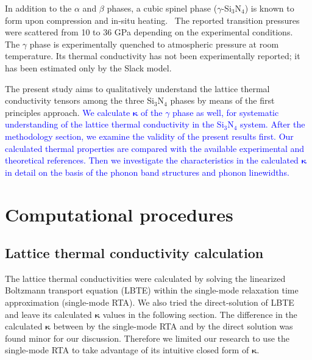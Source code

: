 \documentclass[twocolumn,amsmath,amssymb,a4paper,prb,superscriptaddress,floatfix]{revtex4-1}
\begin{document}
In addition to the $\alpha$ and $\beta$ phases, a cubic spinel phase
($\gamma$-Si$_3$N$_4$) is known to form upon compression and in-situ
heating.~\cite{zerr,zhang} The reported transition pressures were scattered
from 10 to 36 GPa depending on the experimental conditions.~\cite{xu}  The
$\gamma$ phase is experimentally quenched to atmospheric pressure at room
temperature.  Its thermal conductivity has not been experimentally reported; it
has been estimated only by the Slack model.~\cite{morelli} 

The present study aims to qualitatively understand the lattice thermal
conductivity tensors among the three Si$_3$N$_4$ phases by means of the first
principles approach.  \textcolor{blue}{We calculate $\boldsymbol{\kappa}$ of
the $\gamma$ phase as well, for systematic understanding of the lattice
thermal conductivity in the Si$_3$N$_4$ system.  After the methodology
section, we examine the validity of the present results first.  Our
calculated thermal properties are compared with the available experimental
and theoretical references.  Then we investigate the characteristics in the
calculated $\boldsymbol{\kappa}$ in detail on the basis of the phonon band
structures and phonon linewidths.}

\section{Computational procedures}

\subsection{Lattice thermal conductivity calculation}

The lattice thermal conductivities were calculated by solving the linearized
Boltzmann transport equation (LBTE) within the single-mode relaxation time
approximation (single-mode RTA).  We also tried the direct-solution of
LBTE~\cite{chaput-direct} and leave its calculated $\boldsymbol{\kappa}$ values
in the following section. The difference in the calculated
$\boldsymbol{\kappa}$ between by the single-mode RTA and by the direct solution
was found minor for our discussion. Therefore we limited our research to use
the single-mode RTA to take advantage of its intuitive closed form of
$\boldsymbol{\kappa}$.
\end{document}

